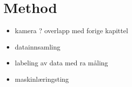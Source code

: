 \chapter{Method}

\begin{itemize}
    \item kamera ? overlapp med forige kapittel
    \item datainnsamling
    \item labeling av data med ra måling
    \item maskinlæringsting
    
\end{itemize}